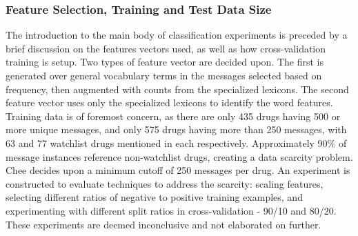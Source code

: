 \documentclass[twoside,11pt]{article}
\begin{document}
\subsubsection{Feature Selection, Training and Test Data Size}
The introduction to the main body of classification experiments is preceded by a brief discussion on the features vectors used, as well as how cross-validation training is setup. Two types of feature vector are decided upon. The first is generated over general vocabulary terms in the messages selected based on frequency, then augmented with counts from the specialized lexicons. The second feature vector uses only the specialized lexicons to identify the word features.
Training data is of foremost concern, as there are only 435 drugs having 500 or more unique messages, and only 575 drugs having more than 250 messages, with 63 and 77 watchlist drugs mentioned in each respectively. Approximately 90\% of message instances reference non-watchlist drugs, creating a data scarcity problem. Chee decides upon a minimum cutoff of 250 messages per drug. An experiment is constructed to evaluate techniques to address the scarcity: scaling features, selecting different ratios of negative to positive training examples, and experimenting with different split ratios in cross-validation - 90/10 and 80/20. These experiments are deemed inconclusive and not elaborated on further.
\end{document}

